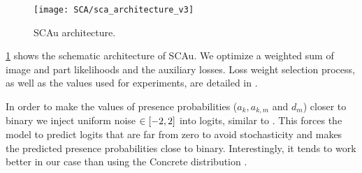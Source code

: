 \begin{figure}
	\centering
	\texttt{[image: SCA/sca\_architecture\_v3]}
	\caption{\gls{SCAu} architecture.}
	\label{fig:sca_arch}
\end{figure}
\cref{fig:sca_arch} shows the schematic architecture of \gls{SCAu}. We optimize a weighted sum of image and part likelihoods and the auxiliary losses. 
Loss weight selection process, as well as the values used for experiments, are detailed in .

In order to make the values of presence probabilities ($a_k, a_{k,m}$ and $d_m$) closer to binary we inject uniform noise $\in {\left[-2, 2\right]}$ into logits, similar to \cite{Tieleman2014thesis}.
This forces the model to predict logits that are far from zero to avoid stochasticity and makes the predicted presence probabilities close to binary.
Interestingly, it tends to work better in our case than using the Concrete distribution \citep{Maddison2017concrete}.